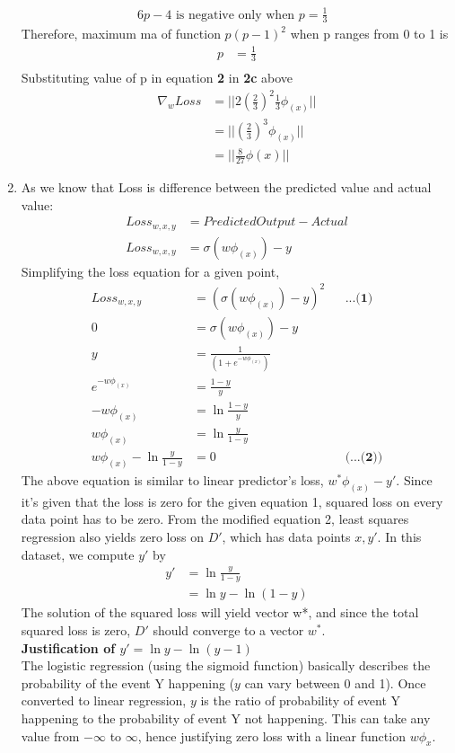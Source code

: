 \documentclass[12pt]{article}
\begin{document}
\begin{enumerate}[label=(\alph*)]
 \begin{align*}
 6p - 4 \text{ is negative only when $p = \frac{1}{3}$ }
 \end{align*}
 Therefore, maximum ma of function $p(p-1)^2$ when p ranges from 0 to 1 is
 \begin{align*}
 p &= \frac{1}{3} \\
 \end{align*}
 Substituting value of p in equation \textbf{2} in \textbf{2c} above
 \begin{align*}
 \nabla_w Loss &= || 2 (\frac{2}{3})^2 \frac{1}{3} \phi_{(x)} || \\
 &= || (\frac{2}{3})^3 \phi_{(x)} || \\
 &= || \frac{8}{27} \phi{(x)} ||
 \end{align*}
 \item As we know that Loss is difference between the predicted value and actual value:
 \begin{align*}
 Loss_{w, x, y} &= Predicted Output - Actual \\
 Loss_{w, x, y}&= \sigma(w\phi_{(x)}) - y
 \end{align*}
 Simplifying the loss equation for a given point,
 \begin{align*}
 Loss_{w, x, y}&=( \sigma(w\phi_{(x)}) - y)^2 && \textbf{...(1)}\\
 0 &= \sigma(w\phi_{(x)}) - y \\
 y &= \frac{1}{(1 + e^{-w\phi_{(x)}})} \\
e^{-w\phi_{(x)}} &= \frac{1 - y}{y} \\
-w\phi_{(x)} &= \ln \frac{1-y}{y} \\
w\phi_{(x)} &= \ln \frac{y}{1 - y} \\
w\phi_{(x)} - \ln \frac{y}{1-y} &= 0 && \textbf{(...(2))}
 \end{align*}
 The above equation is similar to linear predictor's loss, $w^*\phi_{(x)} - y'$. Since it's given that the loss is zero for the given equation 1, squared loss on every data point has to be zero. From the modified equation 2, least squares regression also yields zero loss on $D'$, which has data points $x, y'$. In this dataset, we compute $y'$ by\\
 \begin{align*}
 y' &= \ln \frac{y}{1-y} \\
 &= \ln y - \ln(1 - y)
 \end{align*}
 The solution of the squared loss will yield vector w*, and since the total squared loss is zero, $D'$ should converge to a vector $w^*$. \\
 
 \textbf{Justification of $y' = \ln y - \ln(y-1)$} \\
 The logistic regression (using the sigmoid function) basically describes the probability of the event Y happening ($y$ can vary between 0 and 1). Once converted to linear regression, $y$ is the ratio of probability of event Y happening to the probability of event Y not happening. This can take any value from $-\infty$ to $\infty$, hence justifying zero loss with a linear function $w\phi_x$.
 
\end{enumerate} 
\end{document}
